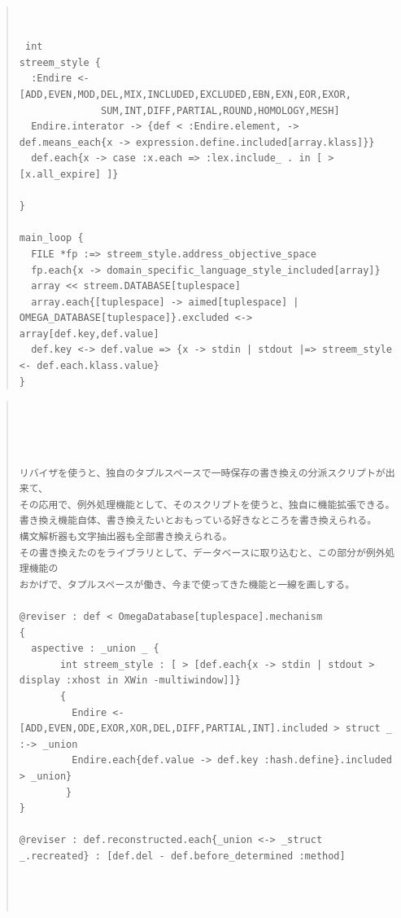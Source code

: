 \documentclass{jsarticle}
\begin{document}
{\begin{quote}
\begin{verbatim}
\end{verbatim}
\end{quote}


\begin{quote}
\setlength{\baselineskip}{12pt}
\begin{verbatim}


 int 
streem_style {
  :Endire <- [ADD,EVEN,MOD,DEL,MIX,INCLUDED,EXCLUDED,EBN,EXN,EOR,EXOR,
              SUM,INT,DIFF,PARTIAL,ROUND,HOMOLOGY,MESH]
  Endire.interator -> {def < :Endire.element, -> def.means_each{x -> expression.define.included[array.klass]}}
  def.each{x -> case :x.each => :lex.include_ . in [ > [x.all_expire] ]}
  
}

main_loop {
  FILE *fp :=> streem_style.address_objective_space
  fp.each{x -> domain_specific_language_style_included[array]}
  array << streem.DATABASE[tuplespace]
  array.each{[tuplespace] -> aimed[tuplespace] | OMEGA_DATABASE[tuplespace]}.excluded <-> array[def.key,def.value]
  def.key <-> def.value => {x -> stdin | stdout |=> streem_style <- def.each.klass.value}
}

\end{verbatim}
\end{quote}

 
\begin{quote}
\setlength{\baselineskip}{12pt}
\begin{verbatim}

 
                      

リバイザを使うと、独自のタプルスペースで一時保存の書き換えの分派スクリプトが出来て、
その応用で、例外処理機能として、そのスクリプトを使うと、独自に機能拡張できる。
書き換え機能自体、書き換えたいとおもっている好きなところを書き換えられる。
構文解析器も文字抽出器も全部書き換えられる。
その書き換えたのをライブラリとして、データベースに取り込むと、この部分が例外処理機能の
おかげで、タプルスペースが働き、今まで使ってきた機能と一線を画しする。　

@reviser : def < OmegaDatabase[tuplespace].mechanism
{
  aspective : _union _ {
       int streem_style : [ > [def.each{x -> stdin | stdout > display :xhost in XWin -multiwindow]]}
       {
         Endire <- [ADD,EVEN,ODE,EXOR,XOR,DEL,DIFF,PARTIAL,INT].included > struct _ :-> _union
         Endire.each{def.value -> def.key :hash.define}.included > _union}
        }
}

@reviser : def.reconstructed.each{_union <-> _struct _.recreated} : [def.del - def.before_determined :method]




\end{verbatim}
\end{quote}}
\end{document}
